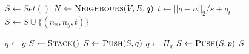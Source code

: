 \begin{algorithm}[ht]
    \caption{$\Function{GetTemporalNeighbours}(V, E, q)$}
    \label{algo:neighbours}
    \begin{algorithmic}[1]
        \setcounter{ALC@line}{0}
        \vspace*{1mm}
        \STATE $S \leftarrow Set()$
        \STATE $N \leftarrow \Function{Neighbours}(V, E, q)$
            \STATE $t \leftarrow ||q - n||_2 / s + q_t$
            \STATE $S \leftarrow S \cup \{(n_x, n_y, t)\}$
        \ENDFOR
    \end{algorithmic}
\end{algorithm}

\begin{algorithm}[ht]
    \caption{$\Function{BacktrackPath}(p, g, \Pi)$}
    \label{algo:backtrack}
    \begin{algorithmic}[1]
        \setcounter{ALC@line}{0}
        \vspace*{1mm}
        \STATE $q \leftarrow g$
        \STATE $S \leftarrow \Function{Stack}()$
            \STATE $S \leftarrow \Function{Push}(S, q)$
            \STATE $q \leftarrow \Pi_q$
        \ENDWHILE
        \STATE $S \leftarrow \Function{Push}(S, p)$
        \RETURN $S$
    \end{algorithmic}
\end{algorithm}
